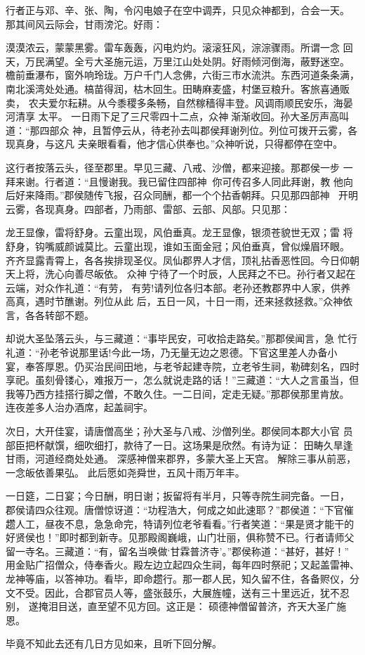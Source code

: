 行者正与邓、辛、张、陶，令闪电娘子在空中调弄，只见众神都到，合会一天。
那其间风云际会，甘雨滂沱。好雨：

漠漠浓云，蒙蒙黑雾。雷车轰轰，闪电灼灼。滚滚狂风，淙淙骤雨。所谓一念
回天，万民满望。全亏大圣施元运，万里江山处处阴。好雨倾河倒海，蔽野迷空。
檐前垂瀑布，窗外响玲珑。万户千门人念佛，六街三市水流洪。东西河道条条满，
南北溪湾处处通。槁苗得润，枯木回生。田畴麻麦盛，村堡豆粮升。客旅喜通贩卖，
农夫爱尔耘耕。从今黍稷多条畅，自然稼穑得丰登。风调雨顺民安乐，海晏河清享
太平。
一日雨下足了三尺零四十二点，众神渐渐收回。孙大圣厉声高叫道：“那四部众
神，且暂停云从，待老孙去叫郡侯拜谢列位。列位可拨开云雾，各现真身，与这凡
夫亲眼看看，他才信心供奉也。”众神听说，只得都停在空中。

这行者按落云头，径至郡里。早见三藏、八戒、沙僧，都来迎接。那郡侯一步
一拜来谢。行者道：“且慢谢我。我已留住四部神，你可传召多人同此拜谢，教
他向后好来降雨。”郡侯随传飞报，召众同酬，都一个个拈香朝拜。只见那四部神
，开明云雾，各现真身。四部者，乃雨部、雷部、云部、风部。只见那：

龙王显像，雷将舒身。云童出现，风伯垂真。龙王显像，银须苍貌世无双；雷
将舒身，钩嘴威颜诚莫比。云童出现，谁如玉面金冠；风伯垂真，曾似燥眉环眼。
齐齐显露青霄上，各各挨排现圣仪。凤仙郡界人才信，顶礼拈香恶性回。今日仰朝
天上将，洗心向善尽皈依。
众神宁待了一个时辰，人民拜之不已。孙行者又起在云端，对众作礼道：“有劳，
有劳!请列位各归本部。老孙还教郡界中人家，供养高真，遇时节醮谢。列位从此
后，五日一风，十日一雨，还来拯救拯救。”众神依言，各各转部不题。

却说大圣坠落云头，与三藏道：“事毕民安，可收拾走路矣。”那郡侯闻言，急
忙行礼道：“孙老爷说那里话!今此一场，乃无量无边之恩德。下官这里差人办备小
宴，奉答厚恩。仍买治民间田地，与老爷起建寺院，立老爷生祠，勒碑刻名，四时
享祀。虽刻骨镂心，难报万一，怎么就说走路的话！”三藏道：“大人之言虽当，但
我等乃西方挂搭行脚之僧，不敢久住。一二日间，定走无疑。”那郡侯那里肯放。
连夜差多人治办酒席，起盖祠宇。

次日，大开佳宴，请唐僧高坐；孙大圣与八戒、沙僧列坐。郡侯同本郡大小官
员部臣把杯献馔，细吹细打，款待了一日。这场果是欣然。有诗为证：
田畴久旱逢甘雨，河道经商处处通。
深感神僧来郡界，多蒙大圣上天宫。
解除三事从前恶，一念皈依善果弘。
此后愿如尧舜世，五风十雨万年丰。

一日筵，二日宴；今日酬，明日谢；扳留将有半月，只等寺院生祠完备。一日，
郡侯请四众往观。唐僧惊讶道：“功程浩大，何成之如此速耶？”郡侯道：“下官催
趱人工，昼夜不息，急急命完，特请列位老爷看看。”行者笑道：“果是贤才能干的
好贤侯也！”即时都到新寺。见那殿阁巍峨，山门壮丽，俱称赞不已。行者请师父
留一寺名。三藏道：“有，留名当唤做‘甘霖普济寺’。”郡侯称道：“甚好，甚好！”
用金贴广招僧众，侍奉香火。殿左边立起四众生祠，每年四时祭祀；又起盖雷神、
龙神等庙，以答神功。看毕，即命趱行。那一郡人民，知久留不住，各备赆仪，分
文不受。因此，合郡官员人等，盛张鼓乐，大展旌幢，送有三十里远近，犹不忍别，
遂掩泪目送，直至望不见方回。这正是：
硕德神僧留普济，齐天大圣广施恩。

毕竟不知此去还有几日方见如来，且听下回分解。